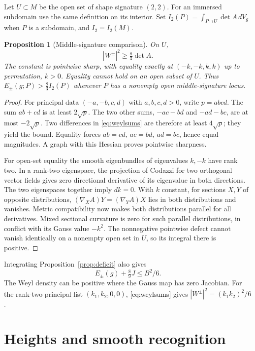 \documentclass[11pt,letterpaper]{article}
\numberwithin{equation}{section}
\newtheorem{proposition}[theorem]{Proposition}
\begin{document}
Let \(U\subset M\) be the open set of shape signature \((2,2)\).
For an immersed subdomain use the same definition on its
interior. Set \(I_2(P)=\int_{P\cap U}\det A\,dV_g\) when \(P\)
is a subdomain, and \(I_2=I_2(M)\).
\begin{proposition}[Middle-signature comparison]\label{prop:middle}
On \(U\),
\begin{equation}\label{eq:middle-weyl}
 |W^\pm|^2\ge \tfrac83\det A .
\end{equation}
The constant is pointwise sharp, with equality exactly at
\((-k,-k,k,k)\) up to permutation, \(k>0\).
Equality cannot hold on an open subset of \(U\).
Thus \(E_\pm(g;P)>\frac83 I_2(P)\) whenever \(P\) has a
nonempty open middle-signature locus.
\end{proposition}
\begin{proof}
For principal data \((-a,-b,c,d)\) with \(a,b,c,d>0\), write
\(p=abcd\). The sum \(ab+cd\) is at least \(2\sqrt p\).
The two other sums, \(-ac-bd\) and \(-ad-bc\), are at
most \(-2\sqrt p\). Two differences in \eqref{eq:weylsums}
are therefore at least \(4\sqrt p\); they yield the bound.
Equality forces \(ab=cd,\ ac=bd,\ ad=bc\), hence equal
magnitudes. A graph with this Hessian proves pointwise sharpness.

For open-set equality the smooth eigenbundles of eigenvalues
\(k,-k\) have rank two. In a rank-two eigenspace, the projection
of Codazzi for two orthogonal vector fields gives zero
directional derivative of its eigenvalue in both directions.
The two eigenspaces together imply \(dk=0\). With \(k\) constant,
for sections \(X,Y\) of opposite distributions,
\((\nabla_X A)Y=(\nabla_Y A)X\) lies in both distributions and
vanishes. Metric compatibility now makes both distributions
parallel for all derivatives. Mixed sectional curvature is zero
for such parallel distributions, in conflict with its Gauss
value \(-k^2\). The nonnegative pointwise defect cannot vanish
identically on a nonempty open set in \(U\), so its integral
there is positive.
\end{proof}
Integrating Proposition~\ref{prop:deficit} also gives
\begin{equation}\label{eq:integrateddeficit}
 E_\pm(g)+\tfrac89 J\le B^2/6 .
\end{equation}
The Weyl density can be positive where the Gauss map has
zero Jacobian. For the rank-two principal list
\((k_1,k_2,0,0)\), \eqref{eq:weylsums} gives
\(|W^\pm|^2=(k_1k_2)^2/6\).

\section{Heights and smooth recognition}
\end{document}
